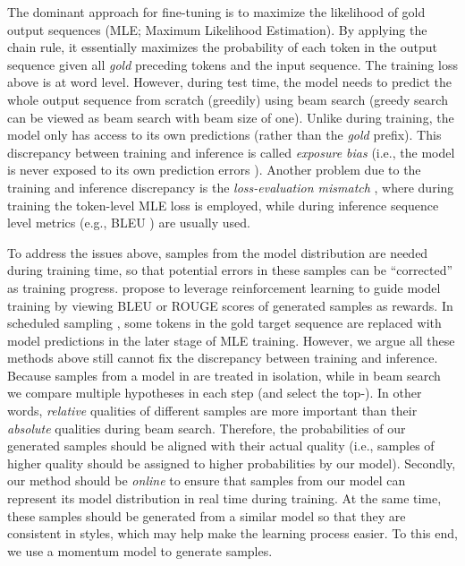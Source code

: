 \documentclass{article}
\begin{document}
The dominant approach for fine-tuning is to maximize the likelihood of gold output sequences (MLE; Maximum Likelihood Estimation). By applying the chain rule, it essentially maximizes the probability of each token in the output sequence given all \emph{gold} preceding tokens and the input sequence. The training loss above is at word level. However, during test time, the model needs to predict the whole output sequence from scratch (greedily) using beam search (greedy search can be viewed as beam search with beam size of one). Unlike during training, the model only has access to its own predictions (rather than the \emph{gold} prefix). This discrepancy between training and inference is called \emph{exposure bias} \cite{ranzato:2015:arxiv} (i.e., the model is never exposed to its own prediction errors \cite{wiseman-rush-2016-sequence}). Another problem due to the training and inference discrepancy is the \emph{loss-evaluation mismatch} \cite{wiseman-rush-2016-sequence}, where during training the token-level MLE loss is employed, while during inference sequence level metrics (e.g., BLEU \cite{papineni-etal-2002-bleu}) are usually used.

To address the issues above, samples from the model distribution are needed during training time, so that potential errors in these samples can be ``corrected'' as training progress. \cite{ranzato:2015:arxiv,edunov2017classical} propose to leverage reinforcement learning to guide model training by viewing BLEU \cite{papineni-etal-2002-bleu} or ROUGE \cite{lin-2004-rouge} scores of generated samples as rewards. In scheduled sampling \cite{bengio2015scheduled}, some tokens in the gold target sequence are replaced with model predictions in the later stage of MLE training. However, we argue all these methods above still cannot fix the discrepancy between training and inference. Because samples from a model in \cite{ranzato:2015:arxiv,edunov2017classical,bengio2015scheduled} are treated in isolation, while in beam search we compare multiple hypotheses in each step (and select the top-). In other words, \emph{relative} qualities of different samples are more important than their \emph{absolute} qualities during beam search. Therefore, the probabilities of our generated samples should be aligned with their actual quality (i.e., samples of higher quality should be assigned to higher probabilities by our model). Secondly, our method should be \emph{online} to ensure that samples from our model can represent its model distribution in real time during training. At the same time, these samples should be generated from a similar model so that they are consistent in styles, which may help make the learning process easier. To this end, we use a momentum model to generate samples.
\end{document}
